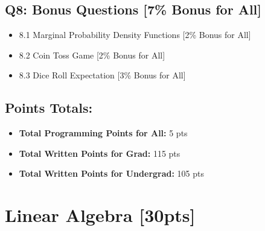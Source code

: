 \documentclass{article}
\begin{document}
\subsection*{Q8: Bonus Questions [7\% Bonus for All]}
\begin{itemize}
    \item 8.1 Marginal Probability Density Functions [2\% Bonus for All]
    \item 8.2 Coin Toss Game [2\% Bonus for All]
    \item 8.3 Dice Roll Expectation [3\% Bonus for All]
\end{itemize}

\subsection*{Points Totals:}
\begin{itemize}
    \item \textbf{Total Programming Points for All:} 5 pts
    \item \textbf{Total Written Points for Grad:} 115 pts
    \item \textbf{Total Written Points for Undergrad:} 105 pts
\end{itemize}


\newpage

\section{Linear Algebra [30pts]}
\end{document}
